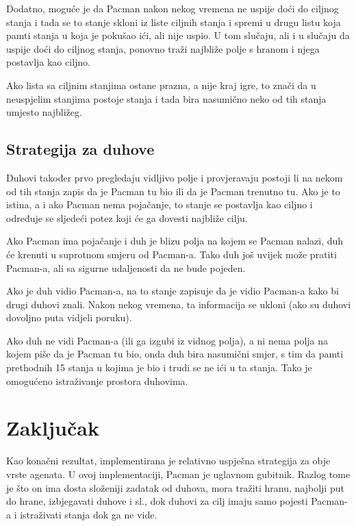 \documentclass[paper=a4, fontsize=11pt]{scrartcl}
\numberwithin{equation}{section}		%
\numberwithin{figure}{section}			%
\numberwithin{table}{section}				%
\begin{document}
Dodatno, moguće je da Pacman nakon nekog vremena ne uspije doći do ciljnog stanja i tada se to stanje skloni iz liste ciljnih stanja i spremi u drugu listu koja pamti stanja u koja je pokušao ići, ali nije uspio. U tom slučaju, ali i u slučaju da uspije doći do ciljnog stanja, ponovno traži najbliže polje s hranom i njega postavlja kao ciljno. 

Ako lista sa ciljnim stanjima ostane prazna, a nije kraj igre, to znači da u neuspjelim stanjima postoje stanja i tada bira nasumično neko od tih stanja umjesto najbližeg.

\subsection{Strategija za duhove}
Duhovi također prvo pregledaju vidljivo polje i provjeravaju postoji li na nekom od tih stanja zapis da je Pacman tu bio ili da je Pacman trenutno tu. Ako je to istina, a i ako Pacman nema pojačanje, to stanje se postavlja kao ciljno i određuje se sljedeći potez koji će ga dovesti najbliže cilju. 

Ako Pacman ima pojačanje i duh je blizu polja na kojem se Pacman nalazi, duh će krenuti u suprotnom smjeru od Pacman-a. Tako duh još uvijek može pratiti Pacman-a, ali sa sigurne udaljenosti da ne bude pojeden. 

Ako je duh vidio Pacman-a, na to stanje zapisuje da je vidio Pacman-a kako bi drugi duhovi znali. Nakon nekog vremena, ta informacija se ukloni (ako su duhovi dovoljno puta vidjeli poruku). 

Ako duh ne vidi Pacman-a (ili ga izgubi iz vidnog polja), a ni nema polja na kojem piše da je Pacman tu bio, onda duh bira nasumični smjer, s tim da pamti prethodnih 15 stanja u kojima je bio i trudi se ne ići u ta stanja. Tako je omogućeno istraživanje prostora duhovima.

\section{Zaključak}
Kao konačni rezultat, implementirana je relativno uspješna strategija za obje vrste agenata. U ovoj implementaciji, Pacman je uglavnom gubitnik. Razlog tome je što on ima dosta složeniji zadatak od duhova, mora tražiti hranu, najbolji put do hrane, izbjegavati duhove i sl., dok duhovi za cilj imaju samo pojesti Pacman-a i istraživati stanja dok ga ne vide.
\end{document}
